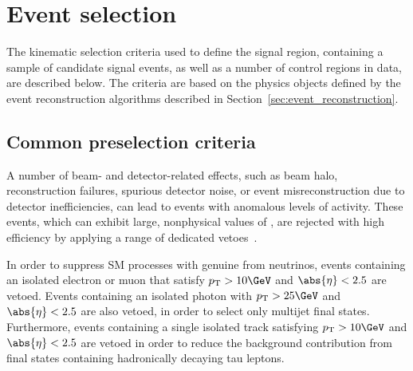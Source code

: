 \section{Event selection}
\label{sec:event_selection}

The kinematic selection criteria used to define the signal region,
containing a sample of candidate signal events, as well as a number of
control regions in data, are described below. The criteria are based
on the physics objects defined by the event reconstruction algorithms
described in Section~\ref{sec:event_reconstruction}.

\subsection{Common preselection criteria}
\label{sec:preselection}

A number of beam- and detector-related effects, such as beam halo,
reconstruction failures, spurious detector noise, or event
misreconstruction due to detector inefficiencies, can lead to events
with anomalous levels of activity. These events, which can exhibit
large, nonphysical values of \ETmiss, are rejected with high
efficiency by applying a range of dedicated
vetoes~\cite{1748-0221-5-03-T03014, CMS-NOTE-2010-012, cms-met}.

In order to suppress SM processes with genuine \ptvecmiss from
neutrinos, events containing an isolated electron or muon that satisfy
$\Pt > 10\GeV$ and $\abs{\eta} < 2.5$ are vetoed. Events containing an
isolated photon with $\Pt > 25\GeV$ and $\abs{\eta} < 2.5$ are also
vetoed, in order to select only multijet final states. Furthermore,
events containing a single isolated track satisfying $\Pt > 10\GeV$
and $\abs{\eta} < 2.5$ are vetoed in order to reduce the background
contribution from final states containing hadronically decaying tau
leptons.

